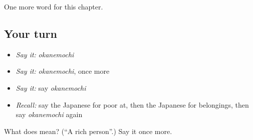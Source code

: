 \begin{grammarlens}[title={What you've built}]
One more word for this chapter.
\end{grammarlens}

\subsection*{Your turn}
\begin{itemize}
\raggedright
  \item \emph{Say it:} \emph{okanemochi}
  \item \emph{Say it:} \emph{okanemochi}, once more
  \item \emph{Say it:} say \emph{okanemochi}
  \item \emph{Recall:} say the Japanese for poor at, then the Japanese for belongings, then say \emph{okanemochi} again
\end{itemize}

\begin{tcolorbox}[breakable,colback=teal!4,colframe=teal!35!black,title={Before you move on}]
What does  mean? (\textquotedblleft{}A rich person\textquotedblright{}.) Say it once more.
\end{tcolorbox}
